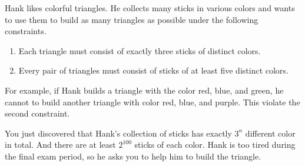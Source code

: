 Hank likes colorful triangles.
He collects many sticks in various colors and wants to use them to build as many triangles as possible 
under the following constraints.
\begin{enumerate}
	\item Each triangle must consist of exactly three sticks of distinct colors.
	\item Every pair of triangles must consist of sticks of at least five distinct colors.
\end{enumerate}

For example, if Hank builds a triangle with the color red, blue, and green,
he cannot to build another triangle with color red, blue, and purple. This violate the second constraint. 

You just discovered that Hank's collection of sticks has exactly $3^n$ different color in total. 
And there are at least $2^{100}$ sticks of each color.
Hank is too tired during the final exam period, so he asks you to help him to build the triangle.
